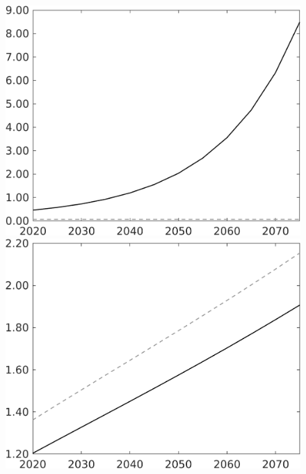 \documentclass[12pt]{article}
\begin{document}
\begin{figure}[h!!]
\begin{minipage}[]{0.32\textwidth}
\end{minipage}	
\begin{minipage}[]{0.32\textwidth}
\includegraphics[width=1\textwidth]{../../codding_model/own_basedOnFried/optimalPol_010922_revision/figures/all_13Sept22/LevTaufNoTauf_TaulCalib_Equlab_regime0_GFF_spillover0_nsk1_xgr1_knspil1_sep1_LFlimit0_emsbase0_countec0_GovRev0_etaa0.79_lgd0.png}
\end{minipage}	
\begin{minipage}[]{0.32\textwidth}
	\includegraphics[width=1\textwidth]{../../codding_model/own_basedOnFried/optimalPol_010922_revision/figures/all_13Sept22/LevTaufNoTauf_TaulCalib_Equlab_regime0_E_spillover0_nsk1_xgr1_knspil1_sep1_LFlimit0_emsbase0_countec0_GovRev0_etaa0.79_lgd0.png}

\end{minipage}
\end{figure}
\end{document}
